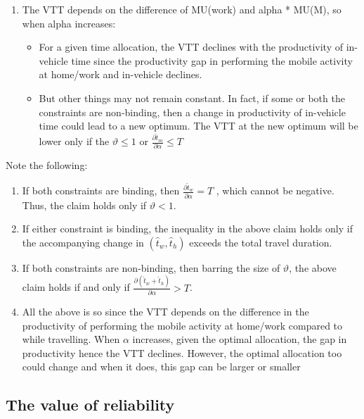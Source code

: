 \documentclass[12pt,a4paper,british]{article}
\begin{document}
{\color{red}
\begin{enumerate}
    \item The VTT depends on the difference of MU(work) and alpha * MU(M), so when alpha increases:
    \begin{itemize}
        \item For a given time allocation, the VTT declines with the productivity of in-vehicle time since the productivity gap in performing the mobile activity at home/work and in-vehicle declines.
        \item But other things may not remain constant. In fact, if some or both the constraints are non-binding, then a change in productivity of in-vehicle time could lead to a new optimum. The VTT at the new optimum will be lower only if the $\vartheta \leq 1$ or $\frac{\partial \hat{t}_{m}}{\partial \alpha} \leq T$
    \end{itemize}
\end{enumerate}
}

Note the following:
\begin{enumerate}
\item If both constraints are binding, then $\frac{\partial\hat{t}_{w}}{\partial\alpha} = T$ , which cannot be negative. Thus, the claim holds only if $\vartheta < 1$.
\item If either constraint is binding, the inequality in the above claim holds only if the accompanying change in $\left(\hat{t}_w,\hat{t}_h\right)$ exceeds the total travel duration.
\item If both constraints are non-binding, then barring the size of $\vartheta$, the above claim holds if and only if $\frac{\partial \left(\hat{t}_w + \hat{t}_h \right)} {\partial\alpha} > T$. 
\item All the above is so since the VTT depends on the difference in the productivity of performing the mobile activity at home/work compared to while travelling. When $\alpha$ increases, given the optimal allocation, the gap in productivity hence the VTT declines. However, the optimal allocation too could change and when it does, this   gap can be larger or smaller 
\end{enumerate}


\subsection*{The value of reliability }
\end{document}
